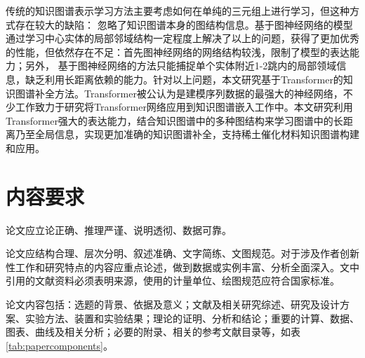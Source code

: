 传统的知识图谱表示学习方法主要考虑如何在单纯的三元组上进行学习，但这种方式存在较大的缺陷：
忽略了知识图谱本身的图结构信息。基于图神经网络的模型通过学习中心实体的局部邻域结构一定程度上解决了以上的问题，获得了更加优秀的性能，但依然存在不足：首先图神经网络的网络结构较浅，限制了模型的表达能力；另外，
基于图神经网络的方法只能捕捉单个实体附近1-2跳内的局部领域信息，缺乏利用长距离依赖的能力。针对以上问题，本文研究基于Transformer的知识图谱补全方法。Transformer被公认为是建模序列数据的最强大的神经网络，不少工作致力于研究将Transformer网络应用到知识图谱嵌入工作中。本文研究利用Transformer强大的表达能力，结合知识图谱中的多种图结构来学习图谱中的长距离乃至全局信息，实现更加准确的知识图谱补全，支持稀土催化材料知识图谱构建和应用。



\section{内容要求}
论文应立论正确、推理严谨、说明透彻、数据可靠。

论文应结构合理、层次分明、叙述准确、文字简练、文图规范。对于涉及作者创新性工作和研究特点的内容应重点论述，做到数据或实例丰富、分析全面深入。文中引用的文献资料必须表明来源，使用的计量单位、绘图规范应符合国家标准。

论文内容包括：选题的背景、依据及意义；文献及相关研究综述、研究及设计方案、实验方法、装置和实验结果；理论的证明、分析和结论；重要的计算、数据、图表、曲线及相关分析；必要的附录、相关的参考文献目录等，如表\ref{tab:papercomponents}。

